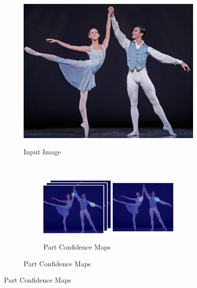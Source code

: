 \begin{figure}[h]
  \begin{subfigure}[t]{0.24\textwidth}
    \includegraphics[width=1\linewidth]{img/openpose_pipeline_a}
    \label{fig:oppA}
    \caption{Input Image}
  \end{subfigure}%
  ~
  \begin{subfigure}[b]{0.24\textwidth}
    \begin{subfigure}{1\textwidth}
      \includegraphics[width=1\linewidth]{img/openpose_pipeline_b}
      \label{fig:oppB}
      \caption{Part Confidence Maps}
    \end{subfigure}
    

\end{subfigure}
\end{figure}
